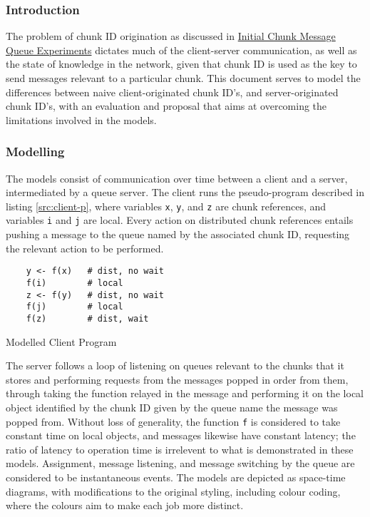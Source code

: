 \subsubsection{Introduction}

The problem of chunk ID origination as discussed in
\href{init-chunk-msg-q-exp.pdf}{Initial Chunk Message Queue Experiments}
dictates much of the client-server communication, as well as the state of
knowledge in the network, given that chunk ID is used as the key to send
messages relevant to a particular chunk.
This document serves to model the differences between naive client-originated
chunk ID's, and server-originated chunk ID's, with an evaluation and proposal
that aims at overcoming the limitations involved in the models.

\subsubsection{Modelling}\label{sec:cid-model}

The models consist of communication over time between a client and a server,
intermediated by a queue server.
The client runs the pseudo-program described in listing \ref{src:client-p},
where variables \texttt{x}, \texttt{y}, and \texttt{z} are chunk references,
and variables \texttt{i} and \texttt{j} are local. 
Every action on distributed chunk references entails pushing a  message to the
queue named by the associated chunk ID, requesting the relevant action to be
performed.

\begin{listing}
\begin{verbatim}
	y <- f(x)	# dist, no wait
	f(i)		# local
	z <- f(y)	# dist, no wait
	f(j)		# local
	f(z)		# dist, wait
\end{verbatim}
\caption{Modelled Client Program}\label{src:client-p}
\end{listing}

The server follows a loop of listening on queues relevant to the chunks that it
stores and performing requests from the messages popped in order from them,
through taking the function relayed in the message and performing it on the
local object identified by the chunk ID given by the queue name the message was
popped from.
Without loss of generality, the function \texttt{f} is considered to take
constant time on local objects, and messages likewise have constant latency;
the ratio of latency to operation time is irrelevent to what is demonstrated in
these models.
Assignment, message listening, and message switching by the queue are
considered to be instantaneous events.
The models are depicted as space-time diagrams, with modifications to the
original styling\cite{lamport1978ordering}, including colour coding, where the
colours aim to make each job more distinct.

